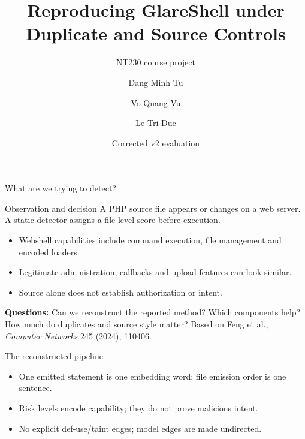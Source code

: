 \documentclass[aspectratio=169,11pt]{beamer}
\title[GlareShell v2]{Reproducing GlareShell under Duplicate and Source Controls}
\subtitle{NT230 course project}
\author[Tu, Vu, Duc]{Dang Minh Tu \and Vo Quang Vu \and Le Tri Duc}
\institute[UIT]{University of Information Technology\\Vietnam National University, Ho Chi Minh City}
\date{Corrected v2 evaluation}
\begin{document}
\begin{frame}
\titlepage
\end{frame}

\begin{frame}{What are we trying to detect?}
\begin{block}{Observation and decision}
A PHP source file appears or changes on a web server. A static detector assigns a file-level score before execution.
\end{block}
\begin{itemize}
\item Webshell capabilities include command execution, file management and encoded loaders.
\item Legitimate administration, callbacks and upload features can look similar.
\item Source alone does not establish authorization or intent.
\end{itemize}
\medskip
\textbf{Questions:} Can we reconstruct the reported method? Which components help? How much do duplicates and source style matter?
\vfill
\footnotesize Based on Feng et al., \emph{Computer Networks} 245 (2024), 110406.
\end{frame}

\begin{frame}{The reconstructed pipeline}
\centering
{}
\medskip
\begin{itemize}
\item One emitted statement is one embedding word; file emission order is one sentence.
\item Risk levels encode capability; they do not prove malicious intent.
\item No explicit def-use/taint edges; model edges are made undirected.
\end{itemize}
\end{frame}
\end{document}
